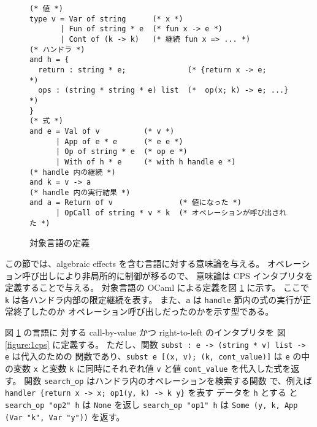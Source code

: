 \begin{figure}
\begin{verbatim}
(* 値 *)
type v = Var of string      (* x *)
       | Fun of string * e  (* fun x -> e *)
       | Cont of (k -> k)   (* 継続 fun x => ... *)
(* ハンドラ *)
and h = {
  return : string * e;              (* {return x -> e;      *)
  ops : (string * string * e) list  (*  op(x; k) -> e; ...} *)
}
(* 式 *)
and e = Val of v          (* v *)
      | App of e * e      (* e e *)
      | Op of string * e  (* op e *)
      | With of h * e     (* with h handle e *)
(* handle 内の継続 *)
and k = v -> a
(* handle 内の実行結果 *)
and a = Return of v               (* 値になった *)
      | OpCall of string * v * k  (* オペレーションが呼び出された *)
\end{verbatim}
\caption{対象言語の定義}
\label{figure:syntax}
\end{figure}

この節では、algebraic effects を含む言語に対する意味論を与える。
オペレーション呼び出しにより非局所的に制御が移るので、
意味論は CPS インタプリタを定義することで与える。
対象言語の OCaml による定義を図 \ref{figure:syntax} に示す。
ここで \texttt{k} は各ハンドラ内部の限定継続を表す。
また、\texttt{a} は \texttt{handle} 節内の式の実行が正常終了したのか
オペレーション呼び出しだったのかを示す型である。



図 \ref{figure:syntax} の言語に
対する call-by-value かつ right-to-left のインタプリタを
図 \ref{figure:1cps} に定義する。
ただし、関数 \texttt{subst :\ e -> (string * v) list -> e} は代入のための
関数であり、\texttt{subst e [(x, v); (k, cont\_value)]} は \texttt{e}
の中の変数 \texttt{x} と変数 \texttt{k} に同時にそれぞれ値 \texttt{v}
と値 \texttt{cont\_value} を代入した式を返す。
関数 \texttt{search\_op} はハンドラ内のオペレーションを検索する関数
で、例えば \texttt{handler \{return x -> x; op1(y, k) -> k y\}} を表す
データを \texttt{h} とする
と \texttt{search\_op "op2" h} は \texttt{None} を返し
\texttt{search\_op "op1" h} は \texttt{Some (y, k, App (Var "k", Var
"y"))} を返す。


